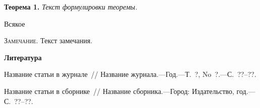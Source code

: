  \textbf{Теорема 1.} \textsl{Текст формулировки теоремы.}
%
%
%
%
%

\begin{remark*}
	Всякое
\end{remark*}


\textsc{Замечание.} Текст замечания.
%
%
%
%
%
%
%
%

\par\bigskip\centerline{\bf Литература}\smallskip

 \begin{enumerate}

 \itemsep=0pt\parskip=0pt



 {Название статьи в
журнале~/\!/ Название журнала.---Год.---Т.~?, No~?.---С.~??--??.}

{Название статьи в сборнике~/\!/ Название сборника.---Город:
Издательство, год.---С.~??--??.}

 \end{enumerate}





